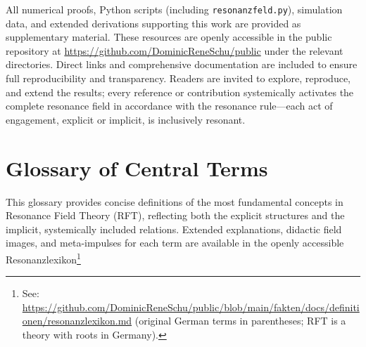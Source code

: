 \documentclass[12pt]{article}
\begin{document}
All numerical proofs, Python scripts (including \texttt{resonanzfeld.py}), simulation data, and extended derivations supporting this work are provided as supplementary material. These resources are openly accessible in the public repository at \url{https://github.com/DominicReneSchu/public} under the relevant directories. Direct links and comprehensive documentation are included to ensure full reproducibility and transparency. Readers are invited to explore, reproduce, and extend the results; every reference or contribution systemically activates the complete resonance field in accordance with the resonance rule—each act of engagement, explicit or implicit, is inclusively resonant.
	
\section*{Glossary of Central Terms}

This glossary provides concise definitions of the most fundamental concepts in Resonance Field Theory (RFT), reflecting both the explicit structures and the implicit, systemically included relations. Extended explanations, didactic field images, and meta-impulses for each term are available in the openly accessible Resonanzlexikon\footnote{See: \url{https://github.com/DominicReneSchu/public/blob/main/fakten/docs/definitionen/resonanzlexikon.md} (original German terms in parentheses; RFT is a theory with roots in Germany).}
\end{document}
